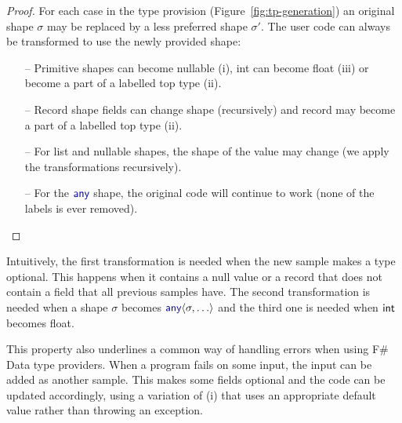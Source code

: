 \documentclass[10pt]{sigplanconf}
\newcommand{\kvd}[1]{\textnormal{\textcolor{kvdclr}{\sffamily #1}}}
\newcommand{\ident}[1]{\textnormal{\sffamily #1}}
\begin{document}
\begin{proof}
For each case in the type provision (Figure~\ref{fig:tp-generation}) an original shape $\sigma$
may be replaced by a less preferred shape $\sigma'$. The user code can always be transformed
to use the newly provided shape:

\begin{itemize}
\item[--] Primitive shapes can become nullable (i), \ident{int} can become \ident{float} (iii)
  or become a part of a labelled top type (ii).
\item[--] Record shape fields can change shape (recursively) and record may become a part
  of a labelled top type (ii).
\item[--] For list and nullable shapes, the shape of the value may change (we apply the
  transformations recursively).
\item[--] For the $\kvd{any}$ shape, the original code will continue to work (none of the labels is ever removed).
\end{itemize}
\vspace{-1.5em}
\end{proof}
%
\noindent
Intuitively, the first transformation is needed when the new sample makes a type optional.
This happens when it contains a \kvd{null} value or a record that does not contain a field
that all previous samples have. The second transformation is needed when a shape $\sigma$
becomes $\kvd{any}\langle\sigma, \ldots\rangle$ and the third one is needed when $\ident{int}$
becomes \ident{float}.

This property also underlines a common way of handling errors when using F\# Data type providers.
When a program fails on some input, the input can be added as another sample. This makes some
fields optional and the code can be updated accordingly, using a variation of (i) that uses
an appropriate default value rather than throwing an exception.



%
%
\end{document}
